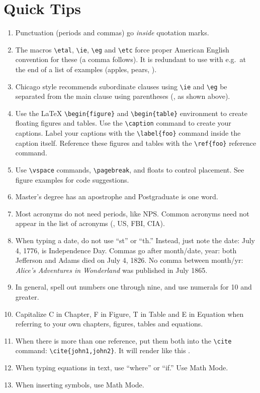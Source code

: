 \section{Quick Tips}\label{sec:tips}
\begin{enumerate}[leftmargin=0.75in] %
    \item Punctuation (periods and commas) go \emph{inside} quotation marks. 
    \item The macros \verb+\etal+, \verb+\ie+, \verb+\eg+ and \verb+\etc+ force proper
      American English convention for these (\ie a comma follows).
      It is redundant to use \etc with e.g.\ at the end of a list of
      examples (\eg apples, pears, \etc).
    \item Chicago style recommends subordinate clauses using \verb+\ie+ and \verb+\eg+ be
    separated from the main clause using parentheses (\eg, as shown above).
    \item Use the \LaTeX{} \verb+\begin{figure}+ and \verb+\begin{table}+ environment to
      create floating figures and tables. Use the \verb+\caption+ command
      to create your captions. Label your captions with the
      \verb+\label{foo}+ command inside the caption itself. Reference
      these figures and tables with the \verb+\ref{foo}+ reference command. 
    \item Use \verb+\vspace+ commands, \verb+\pagebreak+, and floats to control placement. See figure examples for code suggestions.
    \item Master's degree has an apostrophe and Postgraduate is one word. 
    \item Most acronyms do not need periods, like \ac{NPS}. Common acronyms need not appear in the list of acronyms (\eg, \ac{US}, \ac{FBI}, \ac{CIA}).
    \item When typing a date, do not use ``st'' or ``th.'' Instead, just
      note the date: July 4, 1776, is Independence Day. Commas go 
    after month/date, year: both Jefferson and Adams died on July 4, 1826.
    No comma between month/yr: \textit{Alice's Adventures in Wonderland} was published in July 1865.
    \item In general, spell out numbers one through nine, and use numerals for 10 and greater.
    \item Capitalize C in Chapter, F in Figure, T in Table and E in Equation when referring
    to your own chapters, figures, tables and equations.
    \item When there is more than one reference, put them both into the \verb+\cite+ command: \verb+\cite{john1,john2}+. It will render like this \cite{Nekeip:2008,Sushi:1995}.
    \item When typing equations in text, use ``where'' or ``if.'' Use
      Math Mode. 
    \item When inserting symbols, use Math Mode.
\end{enumerate}


